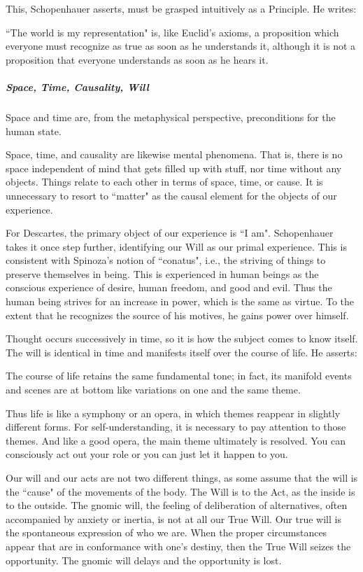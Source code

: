 This, Schopenhauer asserts, must be grasped intuitively as a Principle. He writes:

\begin{quotex}
``The world is my representation" is, like Euclid's axioms, a proposition which everyone must recognize as true as soon as he understands it, although it is not a proposition that everyone understands as soon as he hears it.

\end{quotex}
\subparagraph{Space, Time, Causality, Will}
Space and time are, from the metaphysical perspective, preconditions for the human state.

Space, time, and causality are likewise mental phenomena. That is, there is no space independent of mind that gets filled up with stuff, nor time without any objects. Things relate to each other in terms of space, time, or cause. It is unnecessary to resort to ``matter" as the causal element for the objects of our experience.

For Descartes, the primary object of our experience is ``I am". Schopenhauer takes it once step further, identifying our Will as our primal experience. This is consistent with Spinoza's notion of ``conatus", i.e., the striving of things to preserve themselves in being. This is experienced in human beings as the conscious experience of desire, human freedom, and good and evil. Thus the human being strives for an increase in power, which is the same as virtue. To the extent that he recognizes the source of his motives, he gains power over himself.

Thought occurs successively in time, so it is how the subject comes to know itself. The will is identical in time and manifests itself over the course of life. He asserts:

\begin{quotex}
The course of life retains the same fundamental tone; in fact, its manifold events and scenes are at bottom like variations on one and the same theme.

\end{quotex}
Thus life is like a symphony or an opera, in which themes reappear in slightly different forms. For self-understanding, it is necessary to pay attention to those themes. And like a good opera, the main theme ultimately is resolved. You can consciously act out your role or you can just let it happen to you.

Our will and our acts are not two different things, as some assume that the will is the ``cause" of the movements of the body. The Will is to the Act, as the inside is to the outside. The gnomic will, the feeling of deliberation of alternatives, often accompanied by anxiety or inertia, is not at all our True Will. Our true will is the spontaneous expression of who we are. When the proper circumstances appear that are in conformance with one's destiny, then the True Will seizes the opportunity. The gnomic will delays and the opportunity is lost.

